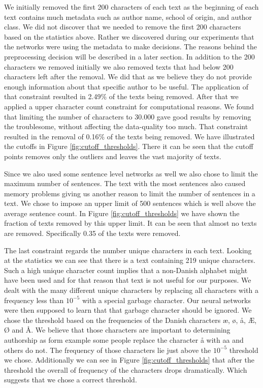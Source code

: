 We initially removed the first 200 characters of each text as the beginning
of each text contains much metadata such as author name, school of origin,
and author class. We did not discover that we needed to remove the first 200
characters based on the statistics above. Rather we discovered during our
experiments that the networks were using the metadata to make decisions.
The reasons behind the preprocessing decision will be described in a later
section. In addition to the 200 characters we removed initially we also
removed texts that had below 200 characters left after the removal. We did
that as we believe they do not provide enough information about that specific
author to be useful. The application of that constraint resulted in 2.49\%
of the texts being removed. After that we applied a upper character count
constraint for computational reasons. We found that limiting the number of
characters to 30.000 gave good results by removing the troublesome, without
affecting the data-quality too much. That constraint resulted in the removal of
0.16\% of the texts being removed. We have illustrated the cutoffs in Figure
\ref{fig:cutoff_thresholds}. There it can be seen that the cutoff points removes
only the outliers and leaves the vast majority of texts.

Since we also used some sentence level networks as well we also chose to limit
the maximum number of sentences. The text with the most sentences also caused
memory problems giving us another reason to limit the number of sentences in a
text. We chose to impose an upper limit of 500 sentences which is well above the
average sentence count. In Figure \ref{fig:cutoff_thresholds} we have shown the
fraction of texts removed by this upper limit. It can be seen that almost no
texts are removed. Specifically 0.35 \textperthousand of the texts were removed.

The last constraint regards the number unique characters in each text. Looking
at the statistics we can see that there is a text containing 219 unique
characters. Such a high unique character count implies that a non-Danish
alphabet might have been used and for that reason that text is not useful for
our purposes. We dealt with the many different unique characters by replacing
all characters with a frequency less than $10^{-5}$ with a special garbage
character. Our neural networks were then supposed to learn that that garbage
character should be ignored. We chose the threshold based on the frequencies
of the Danish characters æ, ø, å, Æ, Ø and Å. We believe that those
characters are important to determining authorship as form example some people
replace the character å with aa and others do not. The frequency of those
characters lie just above the $10^{-5}$ threshold we chose. Additionally we can
see in Figure \ref{fig:cutoff_thresholds} that after the threshold the overall
of frequency of the characters drops dramatically. Which suggests that we chose
a correct threshold.

